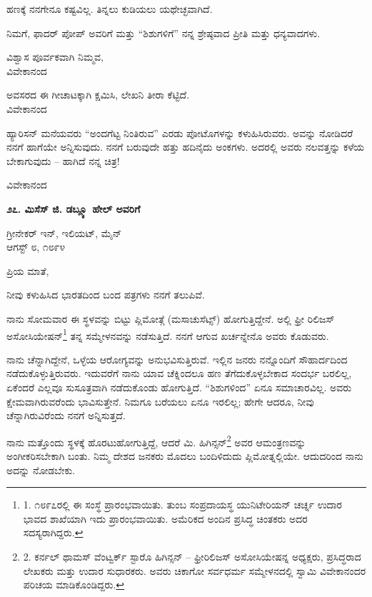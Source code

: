 ಹಣಕ್ಕೆ ನನಗೇನೂ ಕಷ್ಟವಿಲ್ಲ. ತಿನ್ನಲು ಕುಡಿಯಲು ಯಥೇಚ್ಛವಾಗಿದೆ.

ನಿಮಗೆ, ಫಾದರ್ ಪೋಪ್ ಅವರಿಗೆ ಮತ್ತು “ಶಿಶುಗಳಿಗೆ” ನನ್ನ ಶ್ರೇಷ್ಠವಾದ ಪ್ರೀತಿ ಮತ್ತು ಧನ್ಯವಾದಗಳು.

\begin{flushright}
ವಿಶ್ವಾಸ ಪೂರ್ವಕವಾಗಿ ನಿಮ್ಮವ,\\ವಿವೇಕಾನಂದ
\end{flushright}

ಅವಸರದ ಈ ಗೀಚಾಟಕ್ಕಾಗಿ ಕ್ಷಮಿಸಿ, ಲೇಖನಿ ತೀರಾ ಕೆಟ್ಟಿದೆ.\\ವಿವೇಕಾನಂದ

ಹ್ಯಾರಿಸನ್ ಮನೆಯವರು “ಅಂದಗೆಟ್ಟ ನಿಂತಿರುವ” ಎರಡು ಪೋಟೊಗಳನ್ನು ಕಳುಹಿಸಿರುವರು. ಅವನ್ನು ನೋಡಿದರೆ ನನಗೆ ಹಾಗೆಯೇ ಅನ್ನಿಸುವುದು. ನನಗೆ ಬರುವುದೇ ಹತ್ತು ಹದಿನೈದು ಅಂಕಗಳು. ಅದರಲ್ಲಿ ಅವರು ನಲವತ್ತನ್ನು ಕಳೆಯ ಬೇಕಾಗುವುದು – ಹಾಗಿದೆ ನನ್ನ ಚಿತ್ರ!

\begin{flushright}
ವಿವೇಕಾನಂದ
\end{flushright}

\begin{center}
\textbf{೨೭. ಮಿಸೆಸ್ ಜಿ. ಡಬ್ಲ್ಯೂ ಹೇಲ್ ಅವರಿಗೆ}
\end{center}

\begin{flushright}
ಗ್ರೀನೇಕರ್ ಇನ್, ಇಲಿಯಟ್, ಮೈನ್\\ಆಗಸ್ಟ್ ೮, ೧೮೯೪
\end{flushright}

ಪ್ರಿಯ ಮಾತೆ,

ನೀವು ಕಳುಹಿಸಿದ ಭಾರತದಿಂದ ಬಂದ ಪತ್ರಗಳು ನನಗೆ ತಲುಪಿವೆ.

ನಾನು ಸೋಮವಾರ ಈ ಸ್ಥಳವನ್ನು ಬಿಟ್ಟು ಪ್ಲಿಮೋತ್ಗೆ (ಮಸಾಚುಸೆಟ್ಸ್) ಹೋಗುತ್ತಿದ್ದೇನೆ. ಅಲ್ಲಿ ಫ್ರೀ ರಿಲಿಜಸ್ ಅಸೋಸಿಯೇಷನ್\footnote{1. ೧೮೯೭ರಲ್ಲಿ ಈ ಸಂಸ್ಥೆ ಪ್ರಾರಂಭವಾಯಿತು. ತುಂಬ ಸಂಪ್ರದಾಯಸ್ಥ ಯುನಿಟೇರಿಯನ್ ಚರ್ಚ್ನ ಉದಾರ ಭಾವದ ಶಾಖೆಯಾಗಿ ಇದು ಪ್ರಾರಂಭವಾಯಿತು. ಅಮೆರಿಕದ ಅಂದಿನ ಪ್ರಸಿದ್ಧ ಚಿಂತಕರು ಅದರ ಸದಸ್ಯರಾಗಿದ್ದರು.} ತನ್ನ ಸಮ್ಮೇಳನವನ್ನು ನಡೆಸುತ್ತಿದೆ. ನನಗೆ ಆಗುವ ಖರ್ಚನ್ನೇನೊ ಅವರು ಕೊಡುವರು.

ನಾನು ಚೆನ್ನಾಗಿದ್ದೇನೆ, ಒಳ್ಳೆಯ ಆರೋಗ್ಯವನ್ನು ಅನುಭವಿಸುತ್ತಿರುವೆ. ಇಲ್ಲಿನ ಜನರು ನನ್ನೊಂದಿಗೆ ಸೌಹಾರ್ದದಿಂದ ನಡೆದುಕೊಳ್ಳುತ್ತಿರುವರು. ಇದುವರೆಗೆ ನಾನು ಯಾವ ಚೆಕ್ನಿಂದಲೂ ಹಣ ತೆಗೆದುಕೊಳ್ಳಬೇಕಾದ ಸಂದರ್ಭ ಬರಲಿಲ್ಲ, ಏಕೆಂದರೆ ಎಲ್ಲವೂ ಸುಸೂತ್ರವಾಗಿ ನಡೆದುಕೊಂಡು ಹೋಗುತ್ತಿದೆ. “ಶಿಶುಗಳಿಂದ” ಏನೂ ಸಮಾಚಾರವಿಲ್ಲ. ಅವರು ಕ್ಷೇಮವಾಗಿರುವರೆಂದು ಭಾವಿಸುತ್ತೇನೆ. ನಿಮಗೂ ಬರೆಯಲು ಏನೂ ಇರಲಿಲ್ಲ; ಹೇಗೇ ಆದರೂ, ನೀವು ಚೆನ್ನಾಗಿರುವಿರೆಂದು ನನಗೆ ಅನ್ನಿಸುತ್ತದೆ.

ನಾನು ಮತ್ತೊಂದು ಸ್ಥಳಕ್ಕೆ ಹೊರಟುಹೋಗುತ್ತಿದ್ದೆ, ಆದರೆ ಮಿ. ಹಿಗಿನ್ಸನ್\footnote{2. ಕರ್ನಲ್ ಥಾಮಸ್ ವೆಂಟ್ವರ್ಕ್ ಸ್ಟಾರೊ ಹಿಗಿನ್ಸನ್  – ಫ್ರೀರಿಲಿಜಸ್ ಅಸೋಸಿಯೇಷನ್ನ ಅಧ್ಯಕ್ಷರು, ಪ್ರಸಿದ್ಧರಾದ ಲೇಖಕರು ಮತ್ತು ಉದಾರ ಸುಧಾರಕರು. ಅವರು ಚಿಕಾಗೋ ಸರ್ವಧರ್ಮ ಸಮ್ಮೇಳನದಲ್ಲಿ ಸ್ವಾಮಿ ವಿವೇಕಾನಂದರ ಪರಿಚಯ ಮಾಡಿಕೊಂಡಿದ್ದರು.} ಅವರ ಆಮಂತ್ರಣವನ್ನು ಅಂಗೀಕರಿಸಬೇಕಾಗಿ ಬಂತು. ನಿಮ್ಮ ದೇಶದ ಜನಕರು ಮೊದಲು ಬಂದಿಳಿದುದು ಪ್ಲಿಮೋತ್ನಲ್ಲಿಯೇ. ಆದುದರಿಂದ ನಾನು ಅದನ್ನು ನೋಡಬೇಕು.


